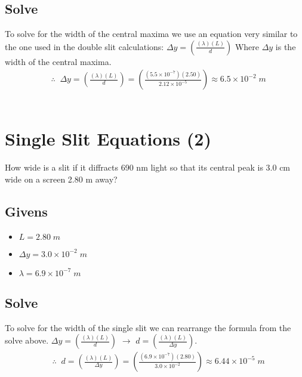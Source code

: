 \documentclass{article}
\begin{document}
\subsection*{Solve}
To solve for the width of the central maxima we use an equation very similar to the one used in the double slit calculations: $\Delta y = \left(\frac{(\lambda)(L)}{d}\right)$ Where $\Delta y$ is the width of the central maxima.\\
\begin{align*}
     & \therefore\;\;\Delta y = \left(\frac{(\lambda)(L)}{d}\right) = \left(\frac{(5.5 \times 10^{-7})(2.50)}{2.12 \times 10^{-5}}\right) \approx 6.5 \times 10^{-2}\;m
\end{align*}\leavevmode\\

\section{Single Slit Equations (2)}
How wide is a slit if it diffracts 690 nm light so that its central peak is 3.0 cm wide on a screen 2.80 m away?
\subsection*{Givens}
\begin{itemize}
    \item $L = 2.80\;m$
    \item $ \Delta y = 3.0 \times 10^{-2}\;m$
    \item $\lambda = 6.9 \times 10^{-7}\;m$
\end{itemize}\leavevmode
\subsection*{Solve}
To solve for the width of the single slit we can rearrange the formula from the solve above. $\Delta y = \left(\frac{(\lambda)(L)}{d}\right)$ $\to$ $d = \left(\frac{(\lambda)(L)}{\Delta y}\right)$.\\
\begin{align*}
     & \therefore\;\;d = \left(\frac{(\lambda)(L)}{\Delta y}\right) = \left(\frac{(6.9 \times 10^{-7})(2.80)}{3.0 \times 10^{-2}}\right) \approx 6.44 \times 10^{-5}\;m
\end{align*}\leavevmode\\
\end{document}
